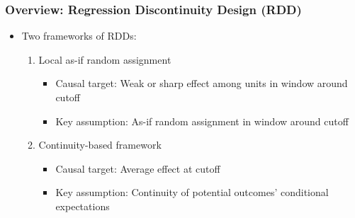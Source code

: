 \documentclass[table, xcolor = {dvipsnames}, 9pt]{beamer}
\theoremstyle{plain}
\begin{document}
\begin{frame}
\frametitle{Overview: Regression Discontinuity Design (RDD)} 
\begin{itemize} \vfill
\item Two frameworks of RDDs: \vfill
\begin{enumerate} \vfill 
\item Local as-if random assignment \\ \citep{cattaneoetal2015,saleshansen2020} \vfill
\begin{itemize} \vfill
\item Causal target: Weak or sharp effect among units in window around cutoff \vfill
\item Key assumption: As-if random assignment in window around cutoff \vfill
\end{itemize} \vfill
\item Continuity-based framework \\ \citep{hahnetal2001,imbenslemieux2008} \vfill
\begin{itemize} \vfill
\item Causal target: Average effect at cutoff \vfill
\item Key assumption: Continuity of potential outcomes' conditional expectations \vfill
\end{itemize} \vfill
\end{enumerate} \vfill
\end{itemize} \vfill
\end{frame}
\end{document}
